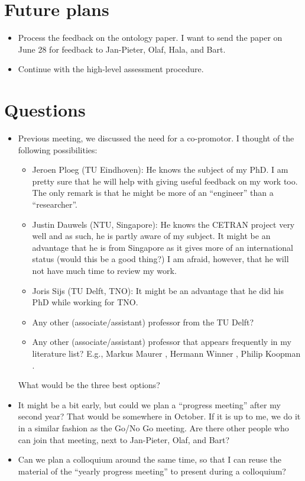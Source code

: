 \documentclass[10pt,final,a4paper,oneside,onecolumn]{article}
\begin{document}
\section{Future plans}

\begin{itemize}
	\item Process the feedback on the ontology paper. I want to send the paper on June 28 for feedback to Jan-Pieter, Olaf, Hala, and Bart.
	\item Continue with the high-level assessment procedure.
\end{itemize}

\section{Questions}

\begin{itemize}
	\item Previous meeting, we discussed the need for a co-promotor. I thought of the following possibilities:
	\begin{itemize}
		\item Jeroen Ploeg (TU Eindhoven): He knows the subject of my PhD. I am pretty sure that he will help with giving useful feedback on my work too. The only remark is that he might be more of an ``engineer'' than a ``researcher''.
		\item Justin Dauwels (NTU, Singapore): He knows the CETRAN project very well and as such, he is partly aware of my subject. It might be an advantage that he is from Singapore as it gives more of an international status (would this be a good thing?) I am afraid, however, that he will not have much time to review my work.
		\item Joris Sijs (TU Delft, TNO): It might be an advantage that he did his PhD while working for TNO.
		\item Any other (associate/assistant) professor from the TU Delft?
		\item Any other (associate/assistant) professor that appears frequently in my literature list? E.g., Markus Maurer \cite{menzel2018scenarios, schuldt2013effiziente, stolte2017hara, ulbrich2015, bagschik2017ontology, wachenfeld2016usecases, bengler2014threedecades}, Hermann Winner \cite{bengler2014threedecades, geyer2014, wachenfeld2016release, wachenfeld2016usecases, winner2017pegasus}, Philip Koopman \cite{koopman2018toward, koopman2017interdisciplinary, wagner2015philosophy, koopman2016challenges}.
	\end{itemize}
	What would be the three best options?
	\item It might be a bit early, but could we plan a ``progress meeting'' after my second year? That would be somewhere in October. If it is up to me, we do it in a similar fashion as the Go/No Go meeting. Are there other people who can join that meeting, next to Jan-Pieter, Olaf, and Bart?
	\item Can we plan a colloquium around the same time, so that I can reuse the material of the ``yearly progress meeting'' to present during a colloquium?
\end{itemize}


\printbibliography
\end{document}
